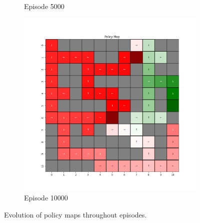 \documentclass{assignment}
\begin{document}
\begin{figure}[H]
\begin{subfigure}{0.3\textwidth}
    \caption{Episode 5000}
    \end{subfigure}\hfill
    \begin{subfigure}{0.3\textwidth}
        \includegraphics[width=\textwidth]{figures/policy_q/epsilon_sweep/policy_alpha_0.1_gamma_0.95_epsilon_0.8_iteration_10000.png}
    \caption{Episode 10000}
    \end{subfigure}
    \caption{Evolution of policy maps throughout episodes.}
    \label{fig:epsilon_0.8_q_learning_policy}
\end{figure}
\end{document}

